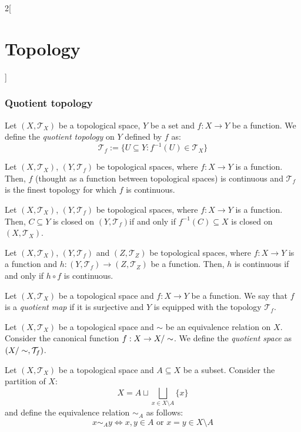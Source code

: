 \documentclass[../../../main.tex]{subfiles}
\begin{document}
\begin{multicols}{2}[\section{Topology}]
  \subsubsection{Quotient topology}
  \begin{definition}
    Let $(X,\mathcal{T}_X)$ be a topological space, $Y$ be a set and $f:X\rightarrow Y$ be a function. We define the \textit{quotient topology} on $Y$ defined by $f$ as: $$\mathcal{T}_f:=\{U\subseteq Y:f^{-1}(U)\in\mathcal{T}_X\}$$
  \end{definition}
  \begin{prop}
    Let $(X,\mathcal{T}_X)$, $(Y,\mathcal{T}_f)$ be topological spaces, where $f:X\rightarrow Y$ is a function. Then, $f$ (thought as a function between topological spaces) is continuous and $\mathcal{T}_f$ is the finest topology for which $f$ is continuous.
  \end{prop}
  \begin{prop}
    Let $(X,\mathcal{T}_X)$, $(Y,\mathcal{T}_f)$ be topological spaces, where $f:X\rightarrow Y$ is a function. Then, $C\subseteq Y$ is closed on $(Y,\mathcal{T}_f)$if and only if $f^{-1}(C)\subseteq X$ is closed on $(X,\mathcal{T}_X)$.
  \end{prop}
  \begin{prop}
    Let $(X,\mathcal{T}_X)$, $(Y,\mathcal{T}_f)$ and $(Z,\mathcal{T}_Z)$ be topological spaces, where $f:X\rightarrow Y$ is a function and $h:(Y,\mathcal{T}_f)\rightarrow(Z,\mathcal{T}_Z)$ be a function. Then, $h$ is continuous if and only if $h\circ f$ is continuous.
  \end{prop}
  \begin{definition}
    Let $(X,\mathcal{T}_X)$ be a topological space and $f:X\rightarrow Y$ be a function. We say that $f$ is a \textit{quotient map} if it is surjective and $Y$ is equipped with the topology $\mathcal{T}_f$.
  \end{definition}
  \begin{definition}
    Let $(X,\mathcal{T}_X)$ be a topological space and $\sim$ be an equivalence relation on $X$. Consider the canonical function $f:X\rightarrow\quot{X}{\sim}$. We define the \textit{quotient space} as $(\quot{X}{\sim},\mathcal{T}_f)$.
  \end{definition}
  \begin{definition}
    Let $(X,\mathcal{T}_X)$ be a topological space and $A\subseteq X$ be a subset. Consider the partition of $X$: $$X=A\sqcup\bigsqcup_{x\in X\setminus A}\{x\}$$
    and define the equivalence relation $\sim_A$ as follows: $$x\sim_A y\iff x,y\in A\text{ or }x=y\in X\setminus A$$

\end{definition}
\end{multicols}
\end{document}
